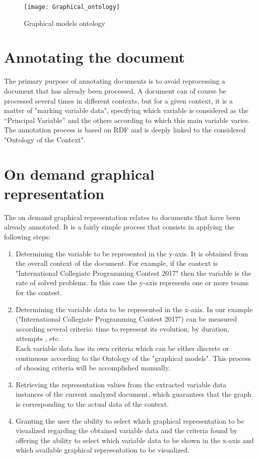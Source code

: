 \bigskip

\begin{figure}[H]
\centering
\texttt{[image: Graphical\_ontology]}
\caption{Graphical models ontology }
\label{fig_Graphical_ontology}
\end{figure}


\section{Annotating the document}
\label{sec_55}

The primary purpose of annotating documents is to avoid reprocessing a document that has already been processed. A document can of course be processed several times in different contexts, but for a given context, it is a matter of "marking variable data", specifying which variable is considered as the “Principal Variable” and the others according to which this main variable varies. The annotation process is based on RDF and is deeply linked to the considered "Ontology of the Context". 




\section{On demand graphical representation}
\label{sec_66}

The on demand graphical representation relates to documents that have been already annotated. It is a fairly simple process that consists in applying the following steps:

\begin{enumerate}[label=(\alph*)]
\item Determining the variable to be represented in the y-axis. It is obtained from the overall context of the document. For example, if the context is "International Collegiate Programming Contest 2017" then the variable is the rate of solved problems. In this case the y-axis represents one or more teams for the contest.

\item  Determining the variable data to be represented in the x-axis. In our example ("International Collegiate Programming Contest 2017") can be measured according several criteria: time to represent its evolution, by duration, attempts , etc. \\
Each variable data has its own criteria which can be either discrete or continuous according to the Ontology of the "graphical models". This process of choosing criteria will be accomplished manually.
\item Retrieving the representation values from the extracted variable data instances of the current analyzed document, which guarantees that the graph is corresponding to the actual data of the context.
\item Granting the user the ability to select which graphical representation to be visualized regarding the obtained variable data and the criteria found by offering the ability to select which variable data to be shown in the x-axis and which available graphical representation to be visualized.
\end{enumerate}

